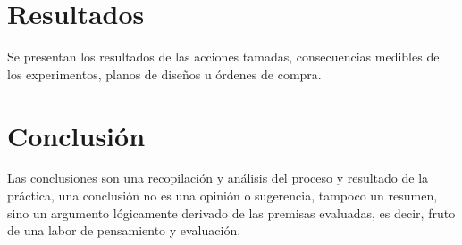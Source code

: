\documentclass{article}
\begin{document}
\section{Resultados}
Se presentan los resultados de las acciones tamadas, consecuencias medibles de los experimentos, planos de diseños u órdenes de compra.


\section{Conclusión}
Las conclusiones son una recopilación y análisis del proceso y resultado de la práctica, una conclusión no es una opinión o sugerencia, tampoco un resumen, sino un argumento lógicamente derivado de las premisas evaluadas, es decir, fruto de una labor de pensamiento y evaluación.





\end{document}
